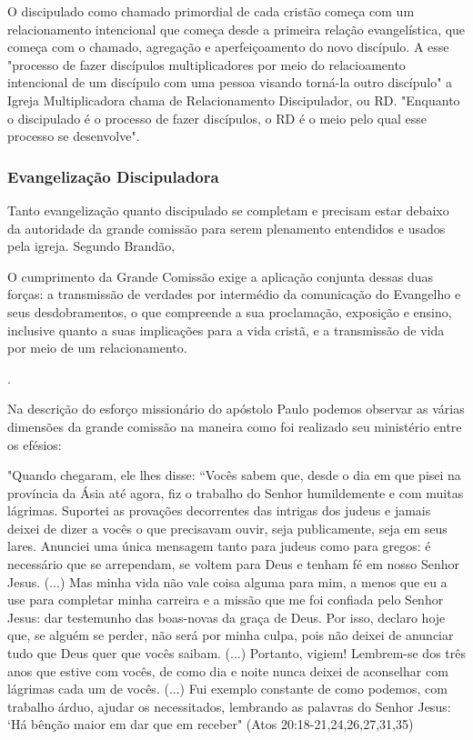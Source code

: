 \documentclass[
	12pt,				%
	openright,			%
	twoside,			%
	a4paper,			%
	english,			%
	french,				%
	spanish,			%
	brazil				%
	]{abntex2}
\begin{document}
O discipulado como chamado primordial de cada cristão começa com um relacionamento intencional que começa desde a primeira relação evangelística, que começa com o chamado, agregação e aperfeiçoamento do novo discípulo. A esse "processo de fazer discípulos multiplicadores por meio do relacioamento intencional de um discípulo com uma pessoa visando torná-la outro discípulo"\cite[64]{brandao} a Igreja Multiplicadora chama de Relacionamento Discipulador, ou RD. "Enquanto o discipulado é o processo de fazer discípulos, o RD é o meio pelo qual esse processo se desenvolve"\cite[64]{brandao}.

\subsubsection{Evangelização Discipuladora}

Tanto evangelização quanto discipulado se completam e precisam estar debaixo da autoridade da grande comissão para serem plenamento entendidos e usados pela igreja. Segundo Brandão,
\begin{citacao}O cumprimento da Grande Comissão exige a aplicação conjunta dessas duas forças: a transmissão de verdades por intermédio da comunicação do Evangelho e seus desdobramentos, o que compreende a sua proclamação, exposição e ensino, inclusive quanto a suas implicações para a vida cristã, e a transmissão de	vida por meio de um relacionamento.\end{citacao} \cite[66]{brandao}.

Na descrição do esforço missionário do apóstolo Paulo podemos observar as várias dimensões da grande comissão na maneira como foi realizado seu ministério entre os efésios:
\begin{citacao}"Quando chegaram, ele lhes disse: “Vocês sabem que, desde o dia em que pisei na província da Ásia até agora, fiz o trabalho do Senhor humildemente e com muitas lágrimas. Suportei as provações decorrentes das intrigas dos judeus e jamais deixei de dizer a vocês o que precisavam ouvir, seja publicamente, seja em seus lares. Anunciei uma única mensagem tanto para judeus como para gregos: é necessário que se arrependam, se voltem para Deus e tenham fé em nosso Senhor Jesus. (...) Mas minha vida não vale coisa alguma para mim, a menos que eu a use para completar minha carreira e a missão que me foi confiada pelo Senhor Jesus: dar testemunho das boas-novas da graça de Deus. Por isso, declaro hoje que, se alguém se perder, não será por minha culpa, pois não deixei de anunciar tudo que Deus quer que vocês saibam. (...) Portanto, vigiem! Lembrem-se dos três anos que estive com vocês, de como dia e noite nunca deixei de aconselhar com lágrimas cada um de vocês. (...) Fui exemplo constante de como podemos, com trabalho árduo, ajudar os necessitados, lembrando as palavras do Senhor Jesus: ‘Há bênção maior em dar que em receber" (Atos 20:18-21,24,26,27,31,35)\end{citacao}
\end{document}
